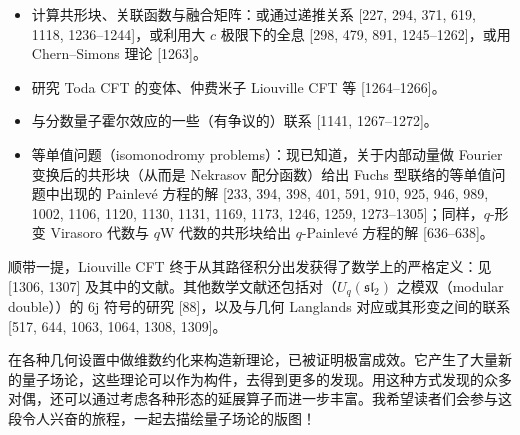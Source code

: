 \begin{itemize}[leftmargin=1.4em,itemsep=3pt,topsep=3pt]
  \item 计算共形块、关联函数与融合矩阵：或通过递推关系 [227, 294, 371, 619, 1118, 1236--1244]，或利用大 $c$ 极限下的全息 [298, 479, 891, 1245--1262]，或用 Chern--Simons 理论 [1263]。
  \item 研究 Toda CFT 的变体、仲费米子 Liouville CFT 等 [1264--1266]。
  \item 与分数量子霍尔效应的一些（有争议的）联系 [1141, 1267--1272]。
  \item 等单值问题（isomonodromy problems）：现已知道，关于内部动量做 Fourier 变换后的共形块（从而是 Nekrasov 配分函数）给出 Fuchs 型联络的等单值问题中出现的 Painlevé 方程的解 [233, 394, 398, 401, 591, 910, 925, 946, 989, 1002, 1106, 1120, 1130, 1131, 1169, 1173, 1246, 1259, 1273--1305]；同样，$q$-形变 Virasoro 代数与 $q$W 代数的共形块给出 $q$-Painlevé 方程的解 [636--638]。
\end{itemize}

顺带一提，Liouville CFT 终于从其路径积分出发获得了数学上的严格定义：见 [1306, 1307] 及其中的文献。其他数学文献还包括对（$U_q(\mathfrak{sl}_2)$ 之模双（modular double））的 6j 符号的研究 [88]，以及与几何 Langlands 对应或其形变之间的联系 [517, 644, 1063, 1064, 1308, 1309]。

在各种几何设置中做维数约化来构造新理论，已被证明极富成效。它产生了大量新的量子场论，这些理论可以作为构件，去得到更多的发现。用这种方式发现的众多对偶，还可以通过考虑各种形态的延展算子而进一步丰富。我希望读者们会参与这段令人兴奋的旅程，一起去描绘量子场论的版图！

